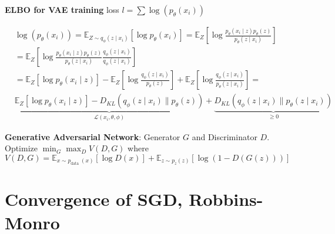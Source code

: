 \textbf{ELBO for VAE training} loss $l=\sum \log \left(p_{\theta}\left(x_{i}\right)\right)$
\begin{tiny}
    \begin{equation*}
        \begin{aligned}
             & \log \left(p_{\theta}\left(x_{i}\right)\right)=\mathbb{E}_{Z \sim q_{\phi}\left(z \mid x_{i}\right)}\left[\log p_{\theta}\left(x_{i}\right)\right] = \mathbb{E}_{Z}\left[\log \frac{p_{\theta}\left(x_{i} \mid z\right) p_{\theta}(z)}{p_{\theta}\left(z \mid x_{i}\right)}\right]                                                                                                                                                                                                                                                                                                                      \\
             & = \mathbb{E}_{Z}\left[\log \frac{p_{\theta}\left(x_{i} \mid z\right) p_{\theta}(z)}{p_{\theta}\left(z \mid x_{i}\right)} \frac{q_{\phi}\left(z \mid x_{i}\right)}{q_{\phi}\left(z \mid x_{i}\right)}\right]                                                                                                                                                                                                                                                                                                                                                                                             \\
             & = \mathbb{E}_{Z}\left[\log p_{\theta}\left(x_{i} \mid z\right)\right] -\mathbb{E}_{Z}\left[\log \frac{q_{\phi}\left(z \mid x_{i}\right)}{p_{\theta}(z)}\right]+\mathbb{E}_{Z}\left[\log \frac{q_{\phi}\left(z \mid x_{i}\right)}{p_{\theta}\left(z \mid x_{i}\right)}\right] = \\
             & \underbrace{\mathbb{E}_{Z}\left[\log p_{\theta}\left(x_{i} \mid z\right)\right]-D_{K L}\left(q_{\phi}\left(z \mid x_{i}\right) \| p_{\theta}(z)\right)}_{\mathcal{L}\left(x_{i}, \theta, \phi\right)}+\underbrace{D_{K L}\left(q_{\phi}\left(z \mid x_{i}\right) \| p_{\theta}\left(z \mid x_{i}\right)\right)}_{\geq 0}
        \end{aligned}
    \end{equation*}
\end{tiny}

\textbf{Generative Adversarial Network}: Generator $G$ and Discriminator $D$. Optimize $\min _{G} \max _{D} V(D, G)$ where $V(D, G) = \mathbb{E}_{x \sim p_{\text {data }}(x)}[\log D(x)]+\mathbb{E}_{z \sim p_{z}(z)}[\log (1-D(G(z)))]$



\section{Convergence of SGD, Robbins-Monro} 
